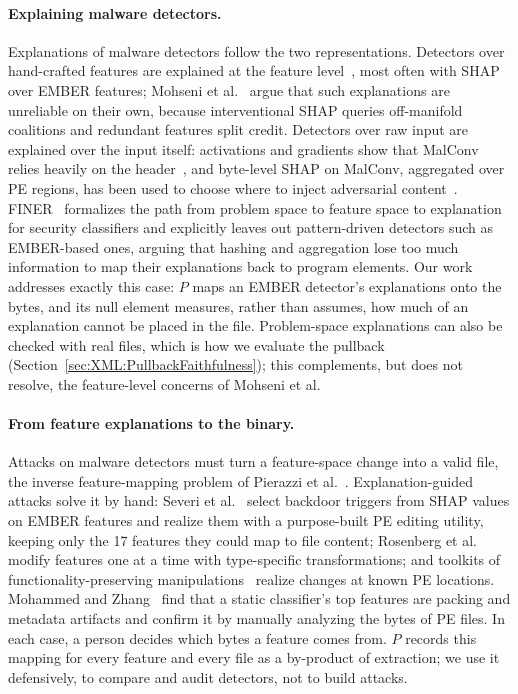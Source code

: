 \paragraph{Explaining malware detectors.} Explanations of malware detectors follow the two representations. Detectors over hand-crafted features are explained at the feature level~\cite{fan2020can, wu2021android, zhu2024dynamic, warnecke2020evaluating}, most often with SHAP over EMBER features; Mohseni et al.~\cite{mohseni2026shap} argue that such explanations are unreliable on their own, because interventional SHAP queries off-manifold coalitions and redundant features split credit. Detectors over raw input are explained over the input itself: activations and gradients show that MalConv relies heavily on the header~\cite{coull2019activation, bose2020explaining, demetrio2019explaining}, and byte-level SHAP on MalConv, aggregated over PE regions, has been used to choose where to inject adversarial content~\cite{aryal2024explainability}. FINER~\cite{he2023finer} formalizes the path from problem space to feature space to explanation for security classifiers and explicitly leaves out pattern-driven detectors such as EMBER-based ones, arguing that hashing and aggregation lose too much information to map their explanations back to program elements. Our work addresses exactly this case: $P$ maps an EMBER detector's explanations onto the bytes, and its null element measures, rather than assumes, how much of an explanation cannot be placed in the file. Problem-space explanations can also be checked with real files, which is how we evaluate the pullback (Section~\ref{sec:XML:PullbackFaithfulness}); this complements, but does not resolve, the feature-level concerns of Mohseni et al.

\paragraph{From feature explanations to the binary.} Attacks on malware detectors must turn a feature-space change into a valid file, the inverse feature-mapping problem of Pierazzi et al.~\cite{pierazzi2020intriguing}. Explanation-guided attacks solve it by hand: Severi et al.~\cite{severi2021explanation} select backdoor triggers from SHAP values on EMBER features and realize them with a purpose-built PE editing utility, keeping only the 17 features they could map to file content; Rosenberg et al.~\cite{rosenberg2020generating} modify features one at a time with type-specific transformations; and toolkits of functionality-preserving manipulations~\cite{demetrio2021adversarial} realize changes at known PE locations. Mohammed and Zhang~\cite{mohammed2026beyond} find that a static classifier's top features are packing and metadata artifacts and confirm it by manually analyzing the bytes of PE files. In each case, a person decides which bytes a feature comes from. $P$ records this mapping for every feature and every file as a by-product of extraction; we use it defensively, to compare and audit detectors, not to build attacks.

